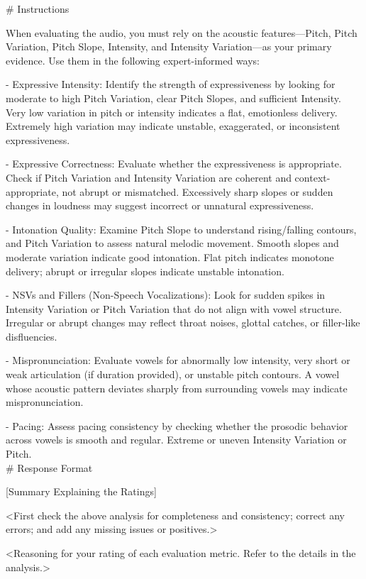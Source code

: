 \begin{tcolorbox}[gray_box, title = {{Prompt Template: Few-shot Acoustic Feature Prompting}}]
\# Instructions

When evaluating the audio, you must rely on the acoustic features—Pitch, Pitch Variation, Pitch Slope, Intensity, and Intensity Variation—as your primary evidence. Use them in the following expert-informed ways:

- Expressive Intensity: Identify the strength of expressiveness by looking for moderate to high Pitch Variation, clear Pitch Slopes, and sufficient Intensity. Very low variation in pitch or intensity indicates a flat, emotionless delivery. Extremely high variation may indicate unstable, exaggerated, or inconsistent expressiveness.

- Expressive Correctness: Evaluate whether the expressiveness is appropriate. Check if Pitch Variation and Intensity Variation are coherent and context-appropriate, not abrupt or mismatched. Excessively sharp slopes or sudden changes in loudness may suggest incorrect or unnatural expressiveness.

- Intonation Quality: Examine Pitch Slope to understand rising/falling contours, and Pitch Variation to assess natural melodic movement. Smooth slopes and moderate variation indicate good intonation. Flat pitch indicates monotone delivery; abrupt or irregular slopes indicate unstable intonation.

- NSVs and Fillers (Non-Speech Vocalizations): Look for sudden spikes in Intensity Variation or Pitch Variation that do not align with vowel structure. Irregular or abrupt changes may reflect throat noises, glottal catches, or filler-like disfluencies.

- Mispronunciation: Evaluate vowels for abnormally low intensity, very short or weak articulation (if duration provided), or unstable pitch contours. A vowel whose acoustic pattern deviates sharply from surrounding vowels may indicate mispronunciation.

- Pacing: Assess pacing consistency by checking whether the prosodic behavior across vowels is smooth and regular. Extreme or uneven Intensity Variation or Pitch. \\

\# Response Format

[Summary Explaining the Ratings]

<First check the above analysis for completeness and consistency; correct any errors; and add any missing issues or positives.>

<Reasoning for your rating of each evaluation metric. Refer to the details in the analysis.>


\end{tcolorbox}
